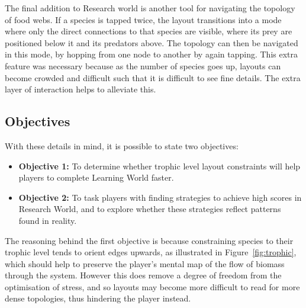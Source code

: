 The final addition to Research world is another tool for navigating the topology of food webs. If a species is tapped twice, the layout transitions into a mode where only the direct connections to that species are visible, where its prey are positioned below it and its predators above. The topology can then be navigated in this mode, by hopping from one node to another by again tapping.
This extra feature was necessary because as the number of species goes up, layouts can become crowded and difficult such that it is difficult to see fine details. The extra layer of interaction helps to alleviate this.

\subsection{Objectives}
With these details in mind, it is possible to state two objectives:
\begin{mdframed}[backgroundcolor=WhiteSmoke]
  \begin{itemize}[leftmargin=*]
    \item \textbf{Objective 1:} To determine whether trophic level layout constraints will help players to complete Learning World faster.
    \item \textbf{Objective 2:} To task players with finding strategies to achieve high scores in Research World, and to explore whether these strategies reflect patterns found in reality.
    \end{itemize}
\end{mdframed}
The reasoning behind the first objective is because constraining species to their trophic level tends to orient edges upwards, as illustrated in Figure~\ref{fig:trophic}, which should help to preserve the player's mental map of the flow of biomass through the system. However this does remove a degree of freedom from the optimisation of stress, and so layouts may become more difficult to read for more dense topologies, thus hindering the player instead.


